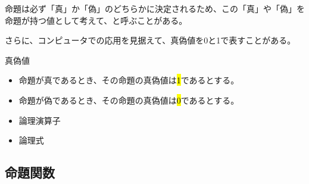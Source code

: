 \documentclass[../../imaging-math]{subfiles}
\begin{document}
命題は必ず「真」か「偽」のどちらかに決定されるため、この「真」や「偽」を命題が持つ値として考えて、と呼ぶことがある。

さらに、コンピュータでの応用を見据えて、真偽値を0と1で表すことがある。

\begin{definition}{真偽値}
  \begin{itemize}
    \item 命題が真であるとき、その命題の真偽値は\hl{1}であるとする。
    \item 命題が偽であるとき、その命題の真偽値は\hl{0}であるとする。
  \end{itemize}
\end{definition}

\begin{mindflow}
  \begin{itemize}
    \item 論理演算子
    \item 論理式
  \end{itemize}
\end{mindflow}

\subsection{命題関数}
\end{document}

